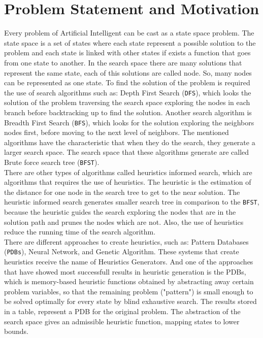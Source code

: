 \section{Problem Statement and Motivation}
\noindent
Every problem of Artificial Intelligent can be cast as a state space problem. The state space is a set of states where each state represent a possible solution to the problem and each state is linked with other states if exists a function that goes from one state to another. In the search space there are many solutions that represent the same state, each of this solutions are called node. So, many nodes can be represented as one state. To find the solution of the problem is required the use of search algorithms such as: Depth First Search (\texttt{DFS}), which looks the solution of the problem traversing the search space exploring the nodes in each branch before backtracking up to find the solution. Another search algorithm is Breadth First Search (\texttt{BFS}), which looks for the solution exploring the neighbors nodes first, before moving to the next level of neighbors. The mentioned algorithms have the characteristic that when they do the search, they generate a larger search space. The search space that these algorithms generate are called Brute force search tree (\texttt{BFST}). \\

There are other types of algorithms called heuristics informed search, which are algorithms that requires the use of heuristics. The heuristic is the estimation of the distance for one node in the search tree to get to the near solution. The heuristic informed search generates smaller search tree in comparison to the \texttt{BFST}, because the heuristic guides the search exploring the nodes that are in the solution path and prunes the nodes which are not. Also, the use of heuristics reduce the running time of the search algorithm. \\

There are different approaches to create heuristics, such as: Pattern Databases (\texttt{PDBs}), Neural Network, and Genetic Algorithm. These systems that create heuristics receive the name of Heuristics Generators. And one of the approaches that have showed most successfull results in heuristic generation is the PDBs, which is memory-based heuristic functions obtained by abstracting away certain problem variables, so that the remaining problem ("pattern") is small enough to be solved optimally for every state by blind exhaustive search. The results stored in a table, represent a PDB for the original problem. The abstraction of the search space gives an admissible heuristic function, mapping states to lower bounds. \\

